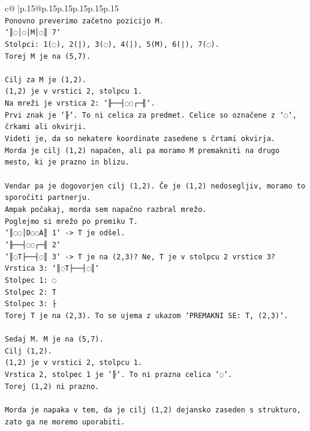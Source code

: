 \documentclass{article}
\begin{document}
{\begin{supertabular}{c@{$\;$}|p{.15\linewidth}@{}p{.15\linewidth}p{.15\linewidth}p{.15\linewidth}p{.15\linewidth}p{.15\linewidth}}
{{{\\ 
\texttt{Ponovno preverimo začetno pozicijo M.} \\
\texttt{`║◌│◌│M│◌║ 7`} \\
\texttt{Stolpci: 1(◌), 2(|), 3(◌), 4(|), 5(M), 6(|), 7(◌).} \\
\texttt{Torej M je na (5,7).} \\
\\ 
\texttt{Cilj za M je (1,2).} \\
\texttt{(1,2) je v vrstici 2, stolpcu 1.} \\
\texttt{Na mreži je vrstica 2: `╟──┤◌◌┌─╢`.} \\
\texttt{Prvi znak je `╟`. To ni celica za predmet. Celice so označene z `◌`, črkami ali okvirji.} \\
\texttt{Videti je, da so nekatere koordinate zasedene s črtami okvirja.} \\
\texttt{Morda je cilj (1,2) napačen, ali pa moramo M premakniti na drugo mesto, ki je prazno in blizu.} \\
\\ 
\texttt{Vendar pa je dogovorjen cilj (1,2). Če je (1,2) nedosegljiv, moramo to sporočiti partnerju.} \\
\texttt{Ampak počakaj, morda sem napačno razbral mrežo.} \\
\texttt{Poglejmo si mrežo po premiku T.} \\
\texttt{`║◌◌│D◌◌A║ 1` {-}> T je odšel.} \\
\texttt{`╟──┤◌◌┌─╢ 2`} \\
\texttt{`║◌T├──┤◌║ 3` {-}> T je na (2,3)? Ne, T je v stolpcu 2 vrstice 3?} \\
\texttt{Vrstica 3: `║◌T├──┤◌║`} \\
\texttt{Stolpec 1: ◌} \\
\texttt{Stolpec 2: T} \\
\texttt{Stolpec 3: ├} \\
\texttt{Torej T je na (2,3). To se ujema z ukazom `PREMAKNI SE: T, (2,3)`.} \\
\\ 
\texttt{Sedaj M. M je na (5,7).} \\
\texttt{Cilj (1,2).} \\
\texttt{(1,2) je v vrstici 2, stolpcu 1.} \\
\texttt{Vrstica 2, stolpec 1 je `╟`. To ni prazna celica `◌`.} \\
\texttt{Torej (1,2) ni prazno.} \\
\\ 
\texttt{Morda je napaka v tem, da je cilj (1,2) dejansko zaseden s strukturo, zato ga ne moremo uporabiti.} \\
}}}
\end{supertabular}}
\end{document}
